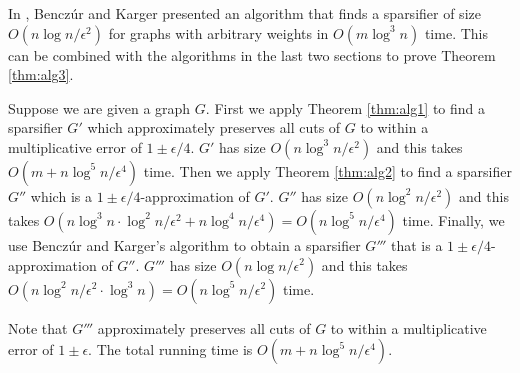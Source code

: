 \documentclass[11pt]{article}
\numberwithin{equation}{section}
\begin{document}
In \cite{BK}, Bencz\'ur and Karger presented an algorithm that finds a sparsifier of size 
$O(n\log n/\epsilon^2)$ for graphs with arbitrary weights in $O(m\log^3 n)$ time. 
This can be combined with the algorithms in the last two sections
to prove Theorem \ref{thm:alg3}.

Suppose we are given a graph $G$.
First we apply Theorem \ref{thm:alg1} to find a sparsifier $G'$
which approximately preserves all cuts of $G$ to within a multiplicative error of $1\pm \epsilon/4$.
$G'$ has size $O(n\log^3n/\epsilon^2)$ and
this takes $O(m+n\log^5n/\epsilon^4)$ time. 
Then we apply Theorem \ref{thm:alg2} to find a sparsifier $G''$
which is a $1\pm\epsilon/4$-approximation of $G'$.
$G''$ has size $O(n\log^2n/\epsilon^2)$
and this takes $O(n\log^3n\cdot \log^2n/\epsilon^2+n\log^4 n/\epsilon^4)
=O(n\log^5n/\epsilon^4)$ time.
Finally, we use Bencz\'ur and Karger's algorithm to 
obtain a sparsifier $G'''$ that is a $1\pm \epsilon/4$-approximation of $G''$.
$G'''$ has size $O(n\log n/\epsilon^2)$ and
this takes $O(n\log^2n/\epsilon^2 \cdot \log^3 n)=O(n\log^5n/\epsilon^2)$ time. 

Note that $G'''$ approximately preserves all cuts of $G$ 
to within a multiplicative error of $1\pm \epsilon$.
The total running time is $O(m+n\log^5n/\epsilon^4)$.
\end{document}
